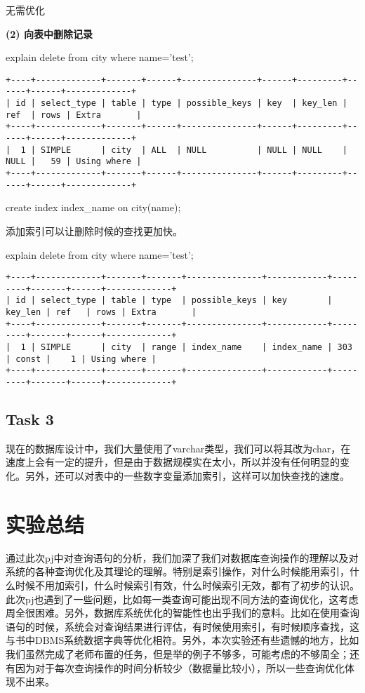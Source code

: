 \documentclass[a4paper, 11pt, nofonts, nocap, fancyhdr]{ctexart}
\begin{document}
无需优化

\vspace{0.7cm}

\textbf{(2) 向表中删除记录} 

explain delete from city where name='test';

\begin{verbatim}
+----+-------------+-------+------+---------------+------+---------+------+------+-------------+
| id | select_type | table | type | possible_keys | key  | key_len | ref  | rows | Extra       |
+----+-------------+-------+------+---------------+------+---------+------+------+-------------+
|  1 | SIMPLE      | city  | ALL  | NULL          | NULL | NULL    | NULL |   59 | Using where |
+----+-------------+-------+------+---------------+------+---------+------+------+-------------+
\end{verbatim}

create index index\_name on city(name);

添加索引可以让删除时候的查找更加快。

explain delete from city where name='test';

\begin{verbatim}
+----+-------------+-------+-------+---------------+------------+---------+-------+------+-------------+
| id | select_type | table | type  | possible_keys | key        | key_len | ref   | rows | Extra       |
+----+-------------+-------+-------+---------------+------------+---------+-------+------+-------------+
|  1 | SIMPLE      | city  | range | index_name    | index_name | 303     | const |    1 | Using where |
+----+-------------+-------+-------+---------------+------------+---------+-------+------+-------------+
\end{verbatim}

\subsection{Task 3}

现在的数据库设计中，我们大量使用了varchar类型，我们可以将其改为char，在速度上会有一定的提升，但是由于数据规模实在太小，所以并没有任何明显的变化。另外，还可以对表中的一些数字变量添加索引，这样可以加快查找的速度。

\section{实验总结}

通过此次pj中对查询语句的分析，我们加深了我们对数据库查询操作的理解以及对系统的各种查询优化及其理论的理解。特别是索引操作，对什么时候能用索引，什么时候不用加索引，什么时候索引有效，什么时候索引无效，都有了初步的认识。此次pj也遇到了一些问题，比如每一类查询可能出现不同方法的查询优化，这考虑周全很困难。另外，数据库系统优化的智能性也出乎我们的意料。比如在使用查询语句的时候，系统会对查询结果进行评估，有时候使用索引，有时候顺序查找，这与书中DBMS系统数据字典等优化相符。另外，本次实验还有些遗憾的地方，比如我们虽然完成了老师布置的任务，但是举的例子不够多，可能考虑的不够周全；还有因为对于每次查询操作的时间分析较少（数据量比较小），所以一些查询优化体现不出来。
\end{document}
